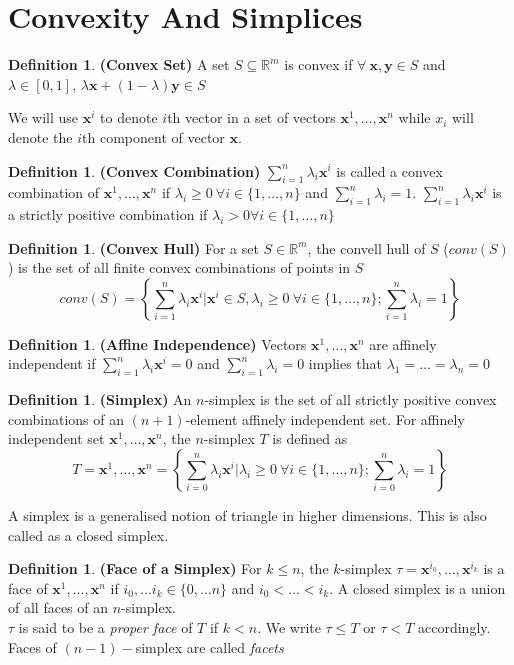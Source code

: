 \documentclass{article}
\theoremstyle{definition}
\newtheorem{defn}[theorem]{Definition}
\begin{document}
\section{Convexity And Simplices}
\begin{defn}
\textbf{(Convex Set)} A set $S\subseteq \mathbb{R}^m$ is convex if $\forall~\mathbf{x,y}\in S$ and $\lambda\in[0,1]$, $\lambda\mathbf{x} + (1-\lambda)\mathbf{y}\in S$
\end{defn}
We will use $\mathbf{x}^i$ to denote $i$th vector in a set of vectors $\mathbf{x}^1,\dots,\mathbf{x}^n$ while $x_i$ will denote the $i$th component of vector $\mathbf{x}$.
\begin{defn}
\textbf{(Convex Combination)} $\sum_{i=1}^n \lambda_i\mathbf{x}^i$ is called a convex combination of $\mathbf{x}^1,\dots,\mathbf{x}^n$ if $\lambda_i\geq 0~\forall i\in\{1,\dots,n\}$ and $\sum_{i=1}^n \lambda_i = 1$. $\sum_{i=1}^n \lambda_i\mathbf{x}^i$ is a strictly positive combination if $\lambda_i >0 \forall i\in\{1,\dots,n\}$ 
\end{defn}
\begin{defn}
\textbf{(Convex Hull)} For a set $S\in \mathbb{R}^m$, the convell hull of $S$ ($conv(S)$) is the set of all finite convex combinations of points in $S$ $$conv(S) = \left\{\sum_{i=1}^n\lambda_i\mathbf{x}^i \vert \mathbf{x}^i\in S, \lambda_i\geq 0~\forall i\in\{1,\dots,n\}; \sum_{i=1}^n \lambda_i = 1 \right\}$$
\end{defn}
\begin{defn}
\textbf{(Affine Independence)} Vectors $\mathbf{x}^1,\dots,\mathbf{x}^n$ are affinely independent if $\sum_{i=1}^n\lambda_i\mathbf{x}^i = 0$ and $\sum_{i=1}^n \lambda_i = 0$ implies that $\lambda_1 = \dots = \lambda_n = 0$ 
\end{defn}
\begin{defn}
\textbf{(Simplex)} An $n$-simplex is the set of all strictly positive convex combinations of an $(n+1)$-element affinely independent set. For affinely independent set $\mathbf{x}^1,\dots,\mathbf{x}^n$, the $n$-simplex $T$ is defined as $$T = \mathbf{x}^1,\dots,\mathbf{x}^n = \left\{\sum_{i=0}^n\lambda_i\mathbf{x}^i \vert \lambda_i\geq 0~\forall i\in\{1,\dots,n\}; \sum_{i=0}^n \lambda_i = 1 \right\}$$
\end{defn}
A simplex is a generalised notion of triangle in higher dimensions. This is also called as a closed simplex.
\begin{defn}
\textbf{(Face of a Simplex)} For $k \leq n$, the $k$-simplex $\tau = \mathbf{x}^{i_0},\dots,\mathbf{x}^{i_k}$ is a face of $\mathbf{x}^1,\dots,\mathbf{x}^n$ if $i_0,\dots i_k\in \{0,\dots n\}$ and $i_0<\dots<i_k$. A closed simplex is a union of all faces of an $n$-simplex.\\

$\tau$ is said to be a \textit{proper face} of $T$ if $k<n$. We write $\tau \leq T$ or $\tau < T$ accordingly. Faces of $(n-1)-$simplex are called \textit{facets}
\end{defn}
\end{document}

